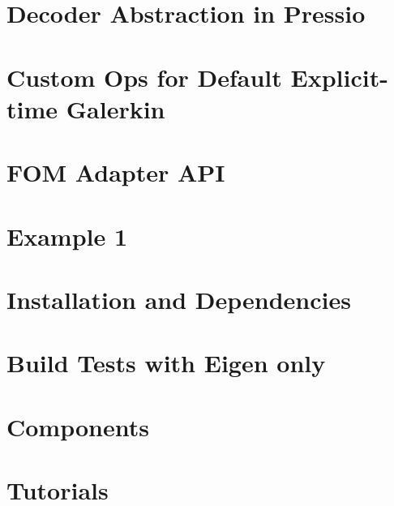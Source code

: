 \let\mypdfximage\pdfximage\def\pdfximage{\immediate\mypdfximage}\documentclass[twoside]{book}
\newcommand{\+}{\discretionary{\mbox{\scriptsize$\hookleftarrow$}}{}{}}
\begin{document}
\chapter{Decoder Abstraction in Pressio}
\label{md_pages_revise_and_pick_coreconcepts_decoder}

\chapter{Custom Ops for Default Explicit-\/time Galerkin}
\label{md_pages_revise_and_pick_custom_ops_default_gal_exp}

\chapter{FOM Adapter API}
\label{md_pages_revise_and_pick_custom_ops}

\chapter{Example 1}
\label{md_pages_revise_and_pick_examples_example1}

\chapter{Installation and Dependencies}
\label{md_pages_revise_and_pick_getstarted_build_and_install}

\chapter{Build Tests with Eigen only}
\label{md_pages_revise_and_pick_getstarted_build_tests_eigen}

\chapter{Components}
\label{md_pages_revise_and_pick_getstarted_packages}

\chapter{Tutorials}
\label{md_pages_revise_and_pick_tutorials}

\end{document}
